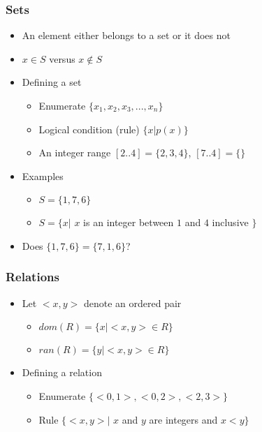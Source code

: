 \documentclass[t,12pt,numbers,fleqn]{beamer}
\begin{document}
\begin{frame}
\frametitle{Sets}
\begin{itemize}
\item An element either belongs to a set or it does not
\item $x \in S$ versus $x \notin S$
\item Defining a set
\begin{itemize}
\item Enumerate $\{ x_1, x_2, x_3, ..., x_n \}$
\item Logical condition (rule) $\{x | p(x) \}$
\item An integer range $[2 .. 4] = \{2, 3, 4\}$, $[7 .. 4] = \{\}$
\end{itemize}
\item Examples
\begin{itemize}
\item $S = \{ 1, 7, 6 \}$
\item $S = \{ x |$ $x$ is an integer between $1$ and $4$ inclusive $\}$
\end{itemize}
\item Does $\{ 1, 7, 6 \} = \{ 7, 1, 6 \}$?
\end{itemize}
\end{frame}


\begin{frame}
\frametitle{Relations}
\begin{itemize}
\item Let $<x, y>$ denote an ordered pair
\begin{itemize}
\item $dom(R) = \{x | <x, y> \in R\}$
\item $ran(R) = \{y | <x, y> \in R\}$
\end{itemize}
\item Defining a relation
\begin{itemize}
\item Enumerate $\{ <0, 1>, <0, 2>, <2, 3> \}$
\item Rule $\{ <x, y> |$ $x$ and $y$ are integers and $x < y \}$
\end{itemize}
\end{itemize}
\end{frame}

\end{document}
